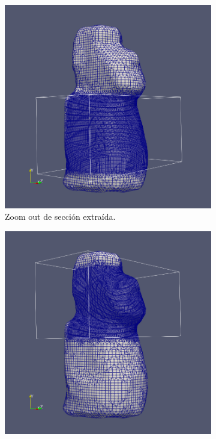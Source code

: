 \begin{figure}[!ht]
    \centering
    \begin{subfigure}[t]{0.45\textwidth}
        \includegraphics[width=1.0\textwidth]{figures/meshes/moai_5r7_01.png}
        \caption{Zoom out de sección extraída.}
    \end{subfigure}
    \begin{subfigure}[t]{0.45\textwidth}
        \includegraphics[width=1.0\textwidth]{figures/meshes/moai_5r7_2_01.png}

\end{subfigure}
\end{figure}

